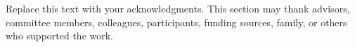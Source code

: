 

Replace this text with your acknowledgments. This section may thank advisors, committee members, colleagues, participants, funding sources, family, or others who supported the work.

\clearpage